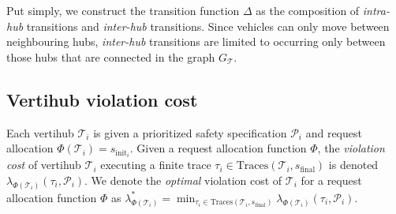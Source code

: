 Put simply, we construct the transition function $\Delta$ as the composition of \emph{intra-hub} transitions and \emph{inter-hub} transitions. Since vehicles can only move between neighbouring hubs, \emph{inter-hub} transitions are limited to occurring only between those hubs that are connected in the graph $G_{\mathcal{T}}$.



\subsection{Vertihub violation cost}
Each vertihub $\mathcal{T}_i$ is given a prioritized safety specification $\mathcal{P}_i$ and request allocation $\Phi(\mathcal{T}_i) = s_{\text{init}_i}$. Given a request allocation function $\Phi$, the \emph{violation cost} of vertihub $\mathcal{T}_i$ executing a finite trace $\tau_i \in \text{Traces}(\mathcal{T}_i,s_{\text{final}})$ 
is denoted $\lambda_{\Phi(\mathcal{T}_i)}(\tau_i,\mathcal{P}_i)$. We denote the \emph{optimal} violation cost of $\mathcal{T}_i$ for a request allocation function $\Phi$ as $\lambda_{\Phi(\mathcal{T}_i)}^* = \min_{\tau_i \in \text{Traces}(\mathcal{T}_i,s_{\text{final}})} \lambda_{\Phi(\mathcal{T}_i)}(\tau_i,\mathcal{P}_i)$. 

